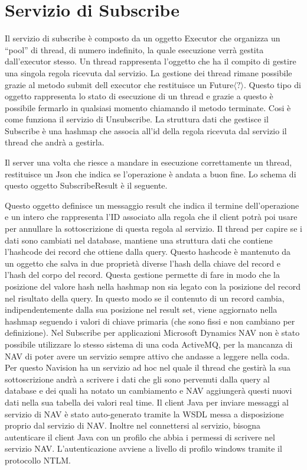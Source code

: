 \section{Servizio di Subscribe}
Il servizio di subscribe è composto da un oggetto Executor che organizza un “pool” di thread, di numero indefinito, la quale esecuzione verrà gestita dall’executor stesso. Un thread rappresenta l’oggetto che ha il compito di gestire una singola regola ricevuta dal servizio. La gestione dei thread rimane possibile grazie al metodo submit dell executor che restituisce un Future$\langle?\rangle{}$. Questo tipo di oggetto rappresenta lo stato di esecuzione di un thread e grazie a questo è possibile fermarlo in qualsiasi momento chiamando il metodo terminate. Cosi è come funziona il servizio di Unsubscribe. La struttura dati che gestisce il Subscribe è una hashmap che associa all’id della regola ricevuta dal servizio il thread che andrà a gestirla. 

Il server una volta che riesce a mandare in esecuzione correttamente un thread, restituisce un Json che indica se l’operazione è andata a buon fine. Lo schema di questo oggetto SubscribeResult è il seguente.
\begin{center}
		{\selectfont
			
		}
\end{center}
Questo oggetto definisce un messaggio result che indica il termine dell’operazione e un intero che rappresenta l’ID associato alla regola che il client potrà poi usare per annullare la sottoscrizione di questa regola al servizio.
Il thread per capire se i dati sono cambiati nel database, mantiene una struttura dati che contiene l’hashcode dei record che ottiene dalla query. Questo hashcode è mantenuto da un oggetto che salva in due proprietà diverse l’hash della chiave del record e l’hash del corpo del record. Questa gestione permette di fare in modo che la posizione del valore hash nella hashmap non sia legato con la posizione del record nel risultato della query. In questo modo se il contenuto di un record cambia, indipendentemente dalla sua posizione nel result set, viene aggiornato nella hashmap seguendo i valori di chiave primaria (che sono fissi e non cambiano per definizione). \newline
Nel Subscribe per applicazioni Microsoft Dynamics NAV non è stato possibile utilizzare lo stesso sistema di una coda ActiveMQ, per la mancanza di NAV di poter avere un servizio sempre attivo che andasse a leggere nella coda. Per questo Navision ha un servizio ad hoc nel quale il thread che gestirà la sua sottoscrizione andrà a scrivere i dati che gli sono pervenuti dalla query al database e dei quali ha notato un cambiamento e NAV aggiungerà questi nuovi dati nella sua tabella dei valori real time. Il client Java per inviare messaggi al servizio di NAV è stato auto-generato tramite la WSDL messa a disposizione proprio dal servizio di NAV. Inoltre nel connettersi al servizio, bisogna autenticare il client Java con un profilo che abbia i permessi di scrivere nel servizio NAV. L’autenticazione avviene a livello di profilo windows tramite il protocollo NTLM. \newline

